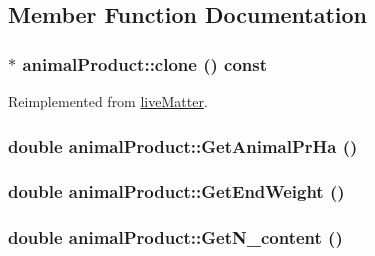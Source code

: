 \subsection{Member Function Documentation}
\hypertarget{classanimal_product_a46df4e113bcf6d492c31250569966806}{
\subsubsection[{clone}]{ $\ast$ animalProduct::clone () const}}
\label{classanimal_product_a46df4e113bcf6d492c31250569966806}


Reimplemented from \hyperlink{classlive_matter_a08101ef64ee3eeec55d222bb75975370}{liveMatter}.\hypertarget{classanimal_product_a284f65c7bfe07411282b8e5a5afe3d1f}{
\subsubsection[{GetAnimalPrHa}]{\setlength{\rightskip}{0pt plus 5cm}double animalProduct::GetAnimalPrHa ()}}
\label{classanimal_product_a284f65c7bfe07411282b8e5a5afe3d1f}
\hypertarget{classanimal_product_a00e6801d87aa22c00f02f1e00f1ceebf}{
\subsubsection[{GetEndWeight}]{\setlength{\rightskip}{0pt plus 5cm}double animalProduct::GetEndWeight ()}}
\label{classanimal_product_a00e6801d87aa22c00f02f1e00f1ceebf}
\hypertarget{classanimal_product_a95a133a9ad5921133cf2fd42b2d88835}{
\subsubsection[{GetN\_\-content}]{\setlength{\rightskip}{0pt plus 5cm}double animalProduct::GetN\_\-content ()}}
